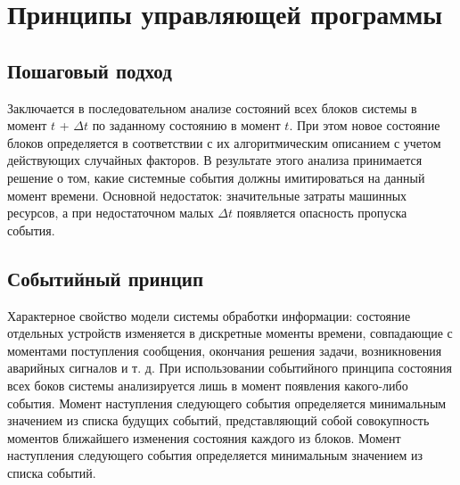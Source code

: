\section{Принципы управляющей программы}

\subsection{Пошаговый подход}

Заключается в последовательном анализе состояний всех блоков системы в момент $t$ + $\Delta t$ по заданному состоянию в момент $t$.
При этом новое состояние блоков определяется в соответствии с их алгоритмическим описанием с учетом действующих случайных факторов.
В результате этого анализа принимается решение о том, какие системные события должны имитироваться на данный момент времени.
Основной недостаток: значительные затраты машинных ресурсов, а при недостаточном малых $\Delta t$ появляется опасность пропуска события.

\subsection{Событийный принцип}

Характерное свойство модели системы обработки информации: состояние отдельных устройств изменяется в дискретные моменты времени, совпадающие с моментами поступления сообщения, окончания решения задачи, возникновения аварийных сигналов и т. д.
При использовании событийного принципа состояния всех боков системы анализируется лишь в момент появления какого-либо события.
Момент наступления следующего события определяется минимальным значением из списка будущих событий, представляющий собой совокупность моментов ближайшего изменения состояния каждого из блоков.
Момент наступления следующего события определяется минимальным значением из списка событий.
